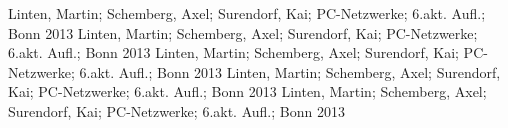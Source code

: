 
 Linten, Martin; Schemberg, Axel; Surendorf, Kai; PC-Netzwerke; 6.akt. Aufl.; Bonn 2013
 Linten, Martin; Schemberg, Axel; Surendorf, Kai; PC-Netzwerke; 6.akt. Aufl.; Bonn 2013
 Linten, Martin; Schemberg, Axel; Surendorf, Kai; PC-Netzwerke; 6.akt. Aufl.; Bonn 2013
 Linten, Martin; Schemberg, Axel; Surendorf, Kai; PC-Netzwerke; 6.akt. Aufl.; Bonn 2013
 Linten, Martin; Schemberg, Axel; Surendorf, Kai; PC-Netzwerke; 6.akt. Aufl.; Bonn 2013